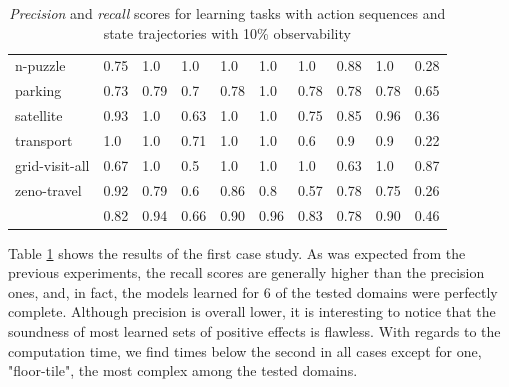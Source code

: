 \begin{table}[hbt!]
\begin{center}
\begin{tabular}{l|l|l|l|l|l|l||l|l|l|}
				n-puzzle & 0.75 & 1.0 & 1.0 & 1.0 & 1.0 & 1.0 & 0.88 & 1.0& 0.28 \\ %
				parking & 0.73 & 0.79 & 0.7 & 0.78 & 1.0 & 0.78 & 0.78 & 0.78& 0.65 \\ %
				satellite & 0.93 & 1.0 & 0.63 & 1.0 & 1.0 & 0.75 & 0.85 & 0.96& 0.36 \\ %
				transport & 1.0 & 1.0 & 0.71 & 1.0 & 1.0 & 0.6 & 0.9 & 0.9& 0.22 \\ %
				grid-visit-all & 0.67 & 1.0 & 0.5 & 1.0 & 1.0 & 1.0 & 0.63 & 1.0& 0.87 \\ %
				zeno-travel & 0.92 & 0.79 & 0.6 & 0.86 & 0.8 & 0.57 & 0.78 & 0.75& 0.26 \\ %
				\hline
				\bf & 0.82 & 0.94 & 0.66 & 0.90 & 0.96 & 0.83 & 0.78 & 0.90 & 0.46 \\
			\end{tabular}
			
		\end{center}
	\caption{\small {\em Precision} and {\em recall} scores for learning tasks with \FO action sequences and \PO state trajectories with 10\% observability}
	\label{tab:results_minimum_100_10}
\end{table}

Table \ref{tab:results_minimum_100_10} shows the results of the first case study. As was expected from the previous experiments, the recall scores are generally higher than the precision ones, and, in fact, the models learned for 6 of the tested domains were perfectly complete. Although precision is overall lower, it is interesting to notice that the soundness of most learned sets of positive effects is flawless. With regards to the computation time, we find times below the second in all cases except for one, "floor-tile", the most complex among the tested domains.

